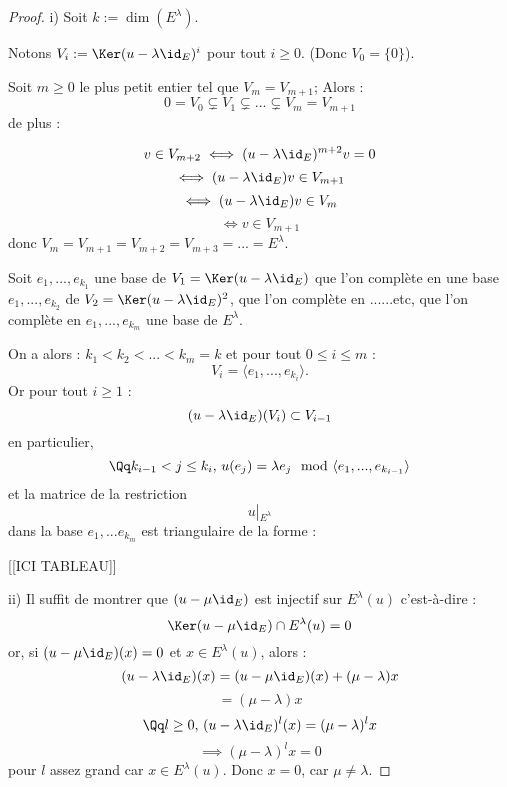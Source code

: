 \documentclass[class=report,crop=false]{standalone}
\newcommand{\Res}[1]{{\left | {}_{#1} \right.}}
\newcommand{\substr}{\subsetneq}%
\begin{document}
\begin{proof}
i) Soit $k :=\dim(E^\lambda)$.

Notons $V_i := \Ker (u-\lambda\id_E)^i$ pour tout $i \ge 0$. (Donc $V_0=\{0\}$).

Soit $m \ge 0$ le plus petit entier tel que $V_m =V_{m+1}$; Alors :
\[0 = V_0 \substr V_1 \substr ... \substr V_m = V_{m+1}\]
de plus :

\[v \in V_{m+2} \iff (u-\lambda\id_E)^{m+2} v = 0\]
\[\iff (u-\lambda\id_E) v \in V_{m+1}\]
\[\iff (u-\lambda \id_E) v \in V_m \]
\[\iff v \in V_{m+1}\]
donc $V_{m}= V_{m+1}= V_{m+2} = V_{m+3} = ... = E^\lambda$.

Soit $e_1,...,e_{k_1}$ une base de $V_1 = \Ker (u-\lambda\id_E)$ que l'on complète en une base $e_1,...,e_{k_2}$ de $V_2 = \Ker (u-\lambda\id_E)^2$, que l'on complète en ......etc, que l'on complète en $e_1,...,e_{k_m}$ une base de $E^\lambda$.

On a alors : $k_1 < k_2 < ... <k_m=k$ et pour tout $ 0 \le i \le m$ :
\[V_i =\langle e_1,...,e_{k_i}\rangle.\]
Or  pour tout $i \ge 1$ :
\[(u-\lambda\id_E) (V_i) \subset V_{i-1}\]
en particulier, \[ \Qq k_{i-1} < j \le k_{i},\,  u(e_j) = \lambda e_j \mod \langle e_1 ,..., e_{k_{i-1}}\rangle\]
et la matrice de la restriction \[u\Res{E^\lambda}\] dans la base $e_1,...e_{k_m}$ est triangulaire de la forme :

[[ICI TABLEAU]]



ii) Il suffit de montrer que $(u-\mu\id_E)$ est injectif sur $E^\lambda(u)$ c'est-à-dire :
\[\Ker(u-\mu\id_E) \cap E^\lambda(u) = 0\]
or, si $(u-\mu \id_E)(x) = 0$ et $x \in E^\lambda(u)$, alors :
\[(u-\lambda\id_E) (x) = (u-\mu\id_E)(x) + (\mu -\lambda)x\]
\[ = (\mu -\lambda) x\]
\[\Qq l \ge 0, \, (u-\lambda\id_E)^l(x) =(\mu-\lambda)^l x\]
\[\implies (\mu-\lambda)^l x = 0\]
pour $l$ assez grand car $x \in E^\lambda(u)$. Donc $x =0$, car $\mu \neq \lambda$.
\end{proof}
\end{document}
